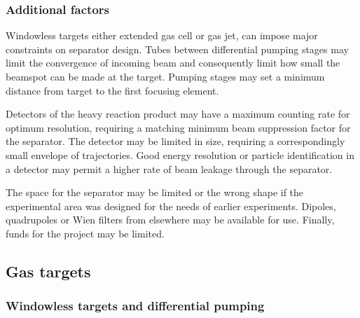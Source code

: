 \subsubsection{Additional factors} 
  Windowless targets either extended gas cell or gas jet, can impose major constraints on separator design.  Tubes between differential pumping stages may limit the convergence of incoming beam and consequently limit how small the beamspot  can be made at the target.  Pumping stages may set a minimum distance from target to the first focusing element.

Detectors of the heavy reaction product may have a maximum counting rate for optimum resolution, requiring a matching minimum beam suppression factor for the separator.   The detector may be limited in size, requiring a correspondingly small envelope of trajectories.    Good energy resolution or particle identification in a detector may permit a higher rate of beam leakage through the separator.

 The space   for the separator may be limited or the wrong shape if the experimental area was designed for the needs of earlier experiments.   Dipoles, quadrupoles  or Wien filters from elsewhere  may be available for use.  Finally,  funds for the project may be limited.   

\subsection{Gas targets}\label{gastarg}

\subsubsection{Windowless targets and differential pumping}


